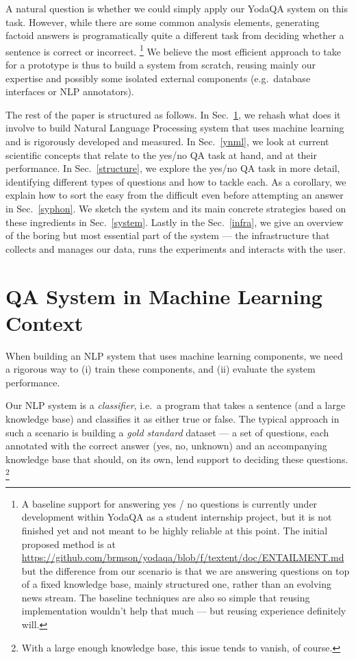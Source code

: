 \documentclass[11pt,a4paper]{article}
\begin{document}
A natural question is whether we could simply apply our YodaQA system
on this task.  However, while there are some common analysis elements,
generating factoid answers is programatically quite a different task
from deciding whether a sentence is correct or incorrect.%
\footnote{A baseline support for answering yes / no questions is currently
under development within YodaQA as a student internship project, but it is
not finished yet and not meant to be highly reliable at this point.
The initial proposed method is at
\url{https://github.com/brmson/yodaqa/blob/f/textent/doc/ENTAILMENT.md}
but the difference from our scenario is that we are answering questions
on top of a fixed knowledge base, mainly structured one, rather than an
evolving news stream.  The baseline techniques are also so simple that
reusing implementation wouldn't help that much --- but reusing experience
definitely will.}
We believe the most efficient approach to take for a prototype is thus
to build a system from scratch, reusing mainly our expertise and possibly
some isolated external components (e.g.\ database interfaces or NLP annotators).

The rest of the paper is structured as follows.
In Sec.~\ref{qaml}, we rehash what does it involve to build Natural Language Processing
system that uses machine learning and is rigorously developed and measured.
In Sec.~\ref{ynml}, we look at current scientific concepts that relate
to the yes/no QA task at hand, and at their performance.
In Sec.~\ref{structure}, we explore the yes/no QA task in more detail,
identifying different types of questions and how to tackle each.
As a corollary, we explain how to sort the easy from the difficult
even before attempting an answer in Sec.~\ref{syphon}.
We sketch the system and its main concrete strategies based on these
ingredients in Sec.~\ref{system}.
Lastly in the Sec.~\ref{infra}, we give an overview of
the boring but most essential part of the system --- the infrastructure
that collects and manages our data, runs the experiments and interacts with the user.

\section{QA System in Machine Learning Context}
\label{qaml}

When building an NLP system that uses machine learning components,
we need a rigorous way to (i) train these components, and (ii) evaluate
the system performance.

Our NLP system is a \textit{classifier}, i.e.\ a program that takes
a sentence (and a large knowledge base) and classifies it as either
true or false.  The typical approach in such a scenario is building
a \textit{gold standard} dataset --- a set of questions, each annotated
with the correct answer (yes, no, unknown) and an accompanying knowledge
base that should, on its own, lend support to deciding these questions.%
\footnote{With a large enough knowledge base, this issue tends to vanish,
of course.}
\end{document}
